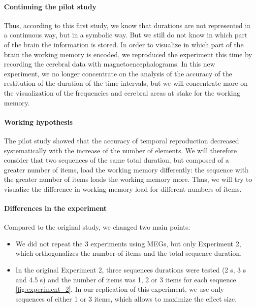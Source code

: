 \paragraph{Continuing the pilot study}
Thus, according to this first study, we know that durations are not represented in a continuous way, but in a symbolic way. But we still do not know in which part of the brain the information is stored. In order to visualize in which part of the brain the working memory is encoded, we reproduced the experiment this time by recording the cerebral data with magnetoencephalograms. In this new experiment, we no longer concentrate on the analysis of the accuracy of the restitution of the duration of the time intervals, but we will concentrate more on the visualization of the frequencies and cerebral areas at stake for the working memory.
 
\paragraph{Working hypothesis}
The pilot study showed that the accuracy of temporal reproduction decreased systematically with the increase of the number of elements. We will therefore consider that two sequences of the same total duration, but composed of a greater number of items, load the working memory differently: the sequence with the greater number of items loads the working memory more. Thus, we will try to visualize the difference in working memory load for different numbers of items.
 
\paragraph{Differences in the experiment}
Compared to the original study, we changed two main points:
 
\begin{itemize}
   \item We did not repeat the 3 experiments using MEGs, but only Experiment 2, which orthogonalizes the number of items and the total sequence duration.
   \item In the original Experiment 2, three sequences durations were tested (2 s, 3 s and 4.5 s) and the number of items was 1, 2 or 3 items for each sequence \ref{fig:experiment_2}. In our replication of this experiment, we use only sequences of either 1 or 3 items, which allows to maximize the effect size.
\end{itemize}
 
 
